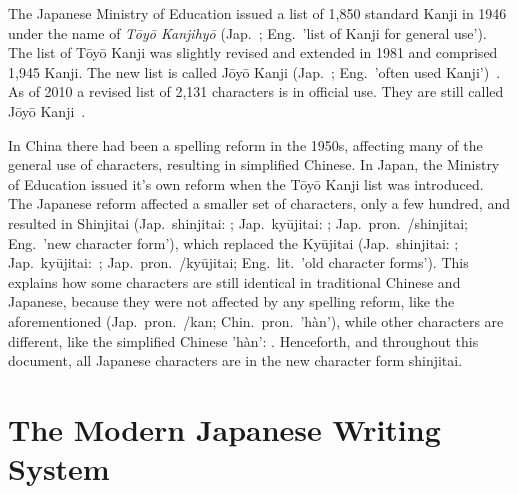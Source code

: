 The Japanese Ministry of Education issued a list of 1,850 standard Kanji in 1946
under the name of \emph{Tōyō Kanjihyō} (Jap.\ ;
Eng.\ 'list of Kanji for general use'). The list of Tōyō Kanji was slightly 
revised and extended in 1981 and comprised 1,945 Kanji. The new list is 
called Jōyō Kanji
(Jap.\ ; Eng.\ 'often used Kanji')~.
As of 2010 a revised list of 2,131 characters is in official 
use. They are still called Jōyō Kanji~. 

In China there had been a spelling reform in the 1950s, affecting many of the
general use of characters, resulting in simplified Chinese. In Japan, 
the Ministry of Education issued it's own reform when the Tōyō Kanji list was 
introduced.
The Japanese reform affected a smaller set of characters, only a few 
hundred, and resulted in Shinjitai (Jap.\ shinjitai: ; 
Jap.\ kyūjitai: ;
Jap.\ pron.\ /shinjitai; Eng.\ 'new character form'), 
which replaced the Kyūjitai 
(Jap.\ shinjitai: ; Jap.\ kyūjitai:\ ; 
Jap.\ pron.\ /kyūjitai; Eng.\ lit.\ 'old character forms'). 
This explains how some characters are still identical in traditional Chinese and 
Japanese, because they were not affected by any spelling reform, like the 
aforementioned  (Jap.\ pron.\ /kan; Chin.\ pron.\ 'hàn'),
while other characters are different, like the simplified 
Chinese 'hàn': . Henceforth, and throughout this document, all Japanese characters are in the new character form shinjitai.

\section{The Modern Japanese Writing System}
\label{sec:modernjapanesewritingsystem}


